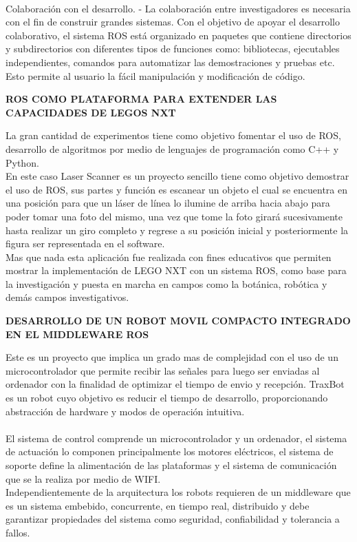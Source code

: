 \documentclass[12pt,a4paper]{article}
\begin{document}
\\
Colaboración con el desarrollo. - La colaboración entre investigadores es necesaria con el fin de construir grandes sistemas. Con el objetivo de apoyar el desarrollo colaborativo, el sistema ROS está organizado en paquetes que contiene directorios y subdirectorios con diferentes tipos de funciones como: bibliotecas, ejecutables independientes, comandos para automatizar las demostraciones y pruebas etc. Esto permite al usuario la fácil manipulación y modificación de código.
\begin{center}
\textbf{ROS COMO PLATAFORMA PARA EXTENDER LAS CAPACIDADES DE LEGOS NXT}
\end{center}
La gran cantidad de experimentos tiene como objetivo fomentar el uso de ROS, desarrollo de algoritmos por medio de lenguajes de programación como C++ y Python. 
\\
En este caso Laser Scanner es un proyecto sencillo tiene como objetivo demostrar el uso de ROS, sus partes y función es escanear un objeto el cual se encuentra en una posición para que un láser de línea lo ilumine de arriba hacia abajo para poder tomar una foto del mismo, una vez que tome la foto girará sucesivamente hasta realizar un giro completo y regrese a su posición inicial y posteriormente la figura ser representada en el software.
\\
Mas que nada esta aplicación fue realizada con fines educativos que permiten mostrar la implementación de LEGO NXT con un sistema ROS, como base para la investigación y puesta en marcha en campos como la botánica, robótica y demás campos investigativos.
\begin{center}
\textbf{DESARROLLO DE UN ROBOT MOVIL COMPACTO INTEGRADO EN EL MIDDLEWARE ROS}
\end{center}
Este es un proyecto que implica un grado mas de complejidad con el uso de un microcontrolador que permite recibir las señales para luego ser enviadas al ordenador con la finalidad de optimizar el tiempo de envio y recepción. TraxBot es un robot cuyo objetivo es reducir el tiempo de desarrollo, proporcionando abstracción de hardware y modos de operación intuitiva.
\\\\
El sistema de control comprende un microcontrolador y un ordenador, el sistema de actuación lo componen principalmente los motores eléctricos, el sistema de soporte define la alimentación de las plataformas y el sistema de comunicación que se la realiza por medio de WIFI.
\\
Independientemente de la arquitectura los robots requieren de un middleware que es un sistema embebido, concurrente, en tiempo real, distribuido y debe garantizar propiedades del sistema como seguridad, confiabilidad y tolerancia a fallos.
\end{document}
